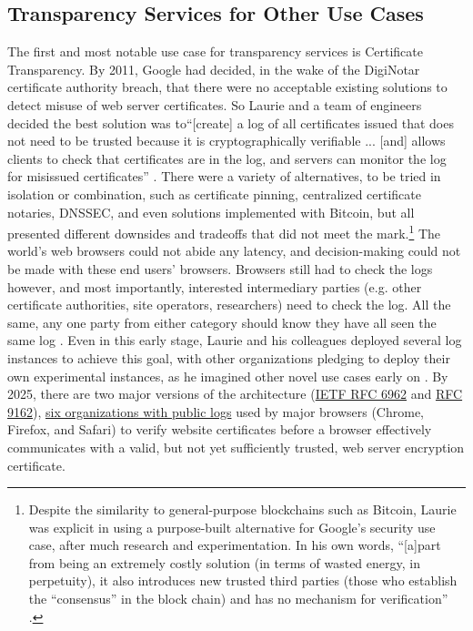 \documentclass{jdf}
\begin{document}
\subsection{Transparency Services for Other Use Cases} \label{use_cases}

The first and most notable use case for transparency services is Certificate Transparency. By 2011, Google had decided, in the wake of the DigiNotar certificate authority breach, that there were no acceptable existing solutions to detect misuse of web server certificates. So Laurie and a team of engineers decided the best solution was to``[create] a log of all certificates issued that does not need to be trusted because it is cryptographically verifiable ... [and] allows clients to check that certificates are in the log, and servers can monitor the log for misissued certificates'' \citeyear[p.~4]{laurie14}. There were a variety of alternatives, to be tried in isolation or combination, such as certificate pinning, centralized certificate notaries, DNSSEC, and even solutions implemented with Bitcoin, but all presented different downsides and tradeoffs that did not meet the mark.\footnote{Despite the similarity to general-purpose blockchains such as Bitcoin, Laurie was explicit in using a purpose-built alternative for Google's security use case, after much research and experimentation. In his own words, ``[a]part from being an extremely costly solution (in terms of wasted energy, in perpetuity), it also introduces new trusted third parties (those who establish the “consensus” in the block chain) and has no mechanism for verification'' \citeyear[p.~4]{laurie14}.} The world's web browsers could not abide any latency, and decision-making could not be made with these end users' browsers. Browsers still had to check the logs however, and most importantly, interested intermediary parties (e.g. other certificate authorities, site operators, researchers) need to check the log. All the same, any one party from either category should know they have all seen the same log \cite[p.~7]{laurie14}. Even in this early stage, Laurie and his colleagues deployed several log instances to achieve this goal, with other organizations pledging to deploy their own experimental instances, as he imagined other novel use cases early on \citeyear[pp.~809]{laurie14}. By 2025, there are two major versions of the architecture (\href{https://datatracker.ietf.org/doc/html/rfc6962}{IETF RFC 6962} and \href{https://datatracker.ietf.org/doc/html/rfc9162}{RFC 9162}), \href{https://certificate.transparency.dev/logs/}{six organizations with public logs} used by major browsers (Chrome, Firefox, and Safari) to verify website certificates before a browser effectively communicates with a valid, but not yet sufficiently trusted, web server encryption certificate.
\end{document}
